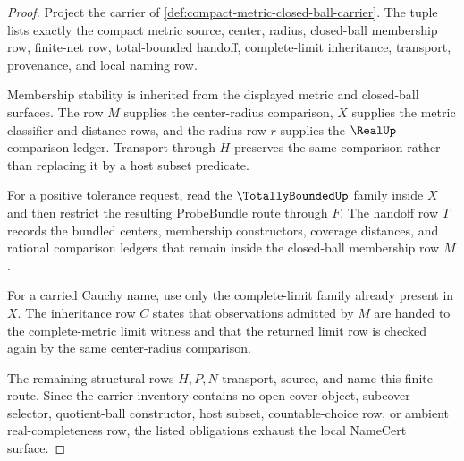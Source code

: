 \begin{proof}
Project the carrier of \autoref{def:compact-metric-closed-ball-carrier}. The tuple lists exactly the compact metric source, center, radius, closed-ball membership row, finite-net row, total-bounded handoff, complete-limit inheritance, transport, provenance, and local naming row.

Membership stability is inherited from the displayed metric and closed-ball surfaces. The row $M$ supplies the center-radius comparison, $X$ supplies the metric classifier and distance rows, and the radius row $r$ supplies the $\RealUp$ comparison ledger. Transport through $H$ preserves the same comparison rather than replacing it by a host subset predicate.

For a positive tolerance request, read the $\TotallyBoundedUp$ family inside $X$ and then restrict the resulting ProbeBundle route through $F$. The handoff row $T$ records the bundled centers, membership constructors, coverage distances, and rational comparison ledgers that remain inside the closed-ball membership row $M$.

For a carried Cauchy name, use only the complete-limit family already present in $X$. The inheritance row $C$ states that observations admitted by $M$ are handed to the complete-metric limit witness and that the returned limit row is checked again by the same center-radius comparison.

The remaining structural rows $H,P,N$ transport, source, and name this finite route. Since the carrier inventory contains no open-cover object, subcover selector, quotient-ball constructor, host subset, countable-choice row, or ambient real-completeness row, the listed obligations exhaust the local NameCert surface.
\end{proof}


\begin{closurestatus}{\CompactMetricClosedBallUp}
  \theoryclosure{\seedClosure}
  \formalstatus{\unformalizedV}
\end{closurestatus}
